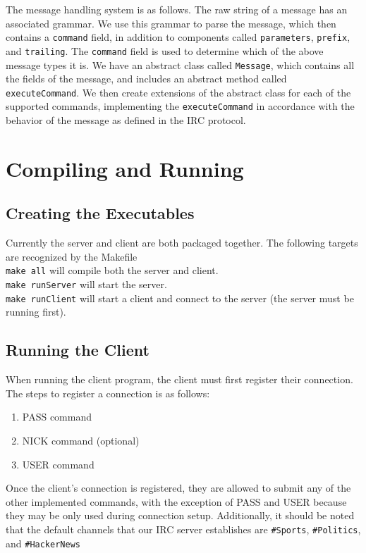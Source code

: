 \documentclass{article}
\begin{document}
The message handling system is as follows.  The raw string of a message has an associated
grammar.  We use this grammar to parse the message, which then contains a \texttt{command}
field, in addition to components called \texttt{parameters}, \texttt{prefix}, and \texttt{trailing}.
The \texttt{command} field is used to determine which of the above message types it is.
We have an abstract class called \texttt{Message}, which contains all the fields of the message,
and includes an abstract method called \texttt{executeCommand}.  We then create extensions of the
abstract class for each of the supported commands, implementing the \texttt{executeCommand} in
accordance with the behavior of the message as defined in the IRC protocol.

\section{Compiling and Running}
\subsection{Creating the Executables}
Currently the server and client are both packaged together. The following targets
are recognized by the Makefile\\

\texttt{make all} will compile both the server and client.\\

\texttt{make runServer} will start the server.\\

\texttt{make runClient} will start a client and connect to the server (the server must be running first).

\subsection{Running the Client}
When running the client program, the client must first register their
connection. The steps to register a connection is as follows:

\begin{enumerate}
    \item PASS command
    \item NICK command (optional)
    \item USER command
\end{enumerate}

Once the client's connection is registered, they are allowed to submit any of
the other implemented commands, with the exception of PASS and USER because
they may be only used during connection setup. Additionally, it should be noted
that the default channels that our IRC server establishes are \texttt{\#Sports},
\texttt{\#Politics}, and \texttt{\#HackerNews}
\end{document}
